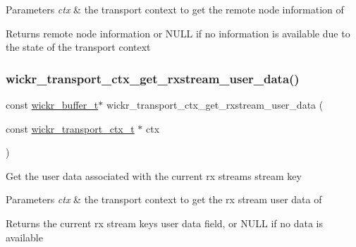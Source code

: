 \begin{DoxyParams}{Parameters}
{\em ctx} & the transport context to get the remote node information of \\
\hline
\end{DoxyParams}
\begin{DoxyReturn}{Returns}
remote node information or N\+U\+LL if no information is available due to the state of the transport context 
\end{DoxyReturn}
\mbox{\label{group__wickr__transport__ctx_ga3ec320d2e4a4010ffa3f411c1ea1419a}} 
\subsubsection{\texorpdfstring{wickr\_transport\_ctx\_get\_rxstream\_user\_data()}{wickr\_transport\_ctx\_get\_rxstream\_user\_data()}}
{\footnotesize\ttfamily const \mbox{\hyperlink{structwickr__buffer}{wickr\+\_\+buffer\+\_\+t}}$\ast$ wickr\+\_\+transport\+\_\+ctx\+\_\+get\+\_\+rxstream\+\_\+user\+\_\+data (\begin{DoxyParamCaption}\item[{const \mbox{\hyperlink{structwickr__transport__ctx}{wickr\+\_\+transport\+\_\+ctx\+\_\+t}} $\ast$}]{ctx }\end{DoxyParamCaption})}

Get the user data associated with the current rx stream\textquotesingle{}s stream key


\begin{DoxyParams}{Parameters}
{\em ctx} & the transport context to get the rx stream user data of \\
\hline
\end{DoxyParams}
\begin{DoxyReturn}{Returns}
the current rx stream key\textquotesingle{}s user data field, or N\+U\+LL if no data is available 
\end{DoxyReturn}
\mbox{\label{group__wickr__transport__ctx_ga3d3ffde9ec2f9f12ecb6999a048e2437}} 
